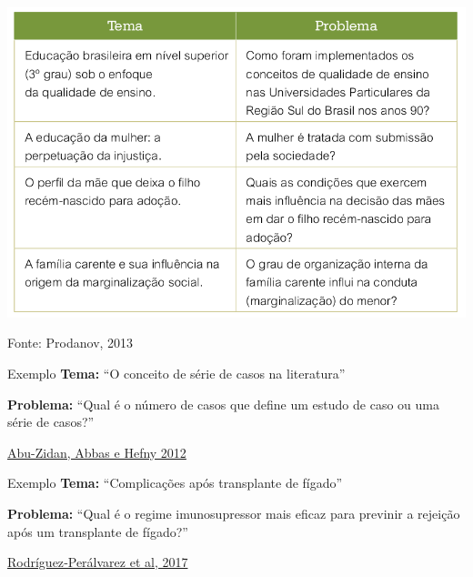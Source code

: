 \documentclass{beamer}
\begin{document}
\begin{frame}
  \begin{center}
  \includegraphics[height=0.8\textheight]{Hipoteses_variaveis/tema_problema}
\end{center}

  \vfill
  \scriptsize
  \hfill Fonte: Prodanov, 2013
\end{frame}

\begin{frame}
  \begin{exampleblock}{Exemplo}
    \small
    {\bf Tema:} ``O conceito de série de casos na literatura''

    \bigskip

    {\bf Problema:} ``Qual é o número de casos que define um estudo de caso ou uma série de casos?''
  \end{exampleblock}

  \vfill
  \scriptsize
  \hfill \href{http://dx.doi.org/10.4314/ahs.v12i4.25}{Abu-Zidan, Abbas e Hefny 2012}
\end{frame}

\begin{frame}
  \begin{exampleblock}{Exemplo}
    \small
    {\bf Tema: }``Complicações após transplante de fígado''

    \bigskip

    {\bf Problema:} ``Qual é o regime imunosupressor mais eficaz para previnir a rejeição após um transplante de fígado?''
  \end{exampleblock}

  \vfill
  \scriptsize
  \hfill \href{https://doi.org/10.1002/14651858.cd011639.pub2}{Rodríguez‐Perálvarez et al, 2017}
\end{frame}
\end{document}
